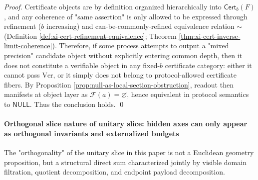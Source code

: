\begin{proof}
Certificate objects are by definition organized hierarchically into \(\mathsf{Cert}_b(F)\), and any coherence of "same assertion" is only allowed to be expressed through refinement (\(b\) increasing) and can-be-commonly-refined equivalence relation \(\sim\) (Definition \ref{def:xi-cert-refinement-equivalence}; Theorem \ref{thm:xi-cert-inverse-limit-coherence}).
Therefore, if some process attempts to output a "mixed precision" candidate object without explicitly entering common depth, then it does not constitute a verifiable object in any fixed-\(b\) certificate category: either it cannot pass \(\mathrm{Ver}\), or it simply does not belong to protocol-allowed certificate fibers.
By Proposition \ref{prop:null-as-local-section-obstruction}, readout then manifests at object layer as \(\mathscr F(a)=\varnothing\), hence equivalent in protocol semantics to \(\mathsf{NULL}\).
Thus the conclusion holds. \qed
\end{proof}

\paragraph{Orthogonal slice nature of unitary slice: hidden axes can only appear as orthogonal invariants and externalized budgets}
The "orthogonality" of the unitary slice in this paper is not a Euclidean geometry proposition, but a structural direct sum characterized jointly by visible domain filtration, quotient decomposition, and endpoint payload decomposition.

